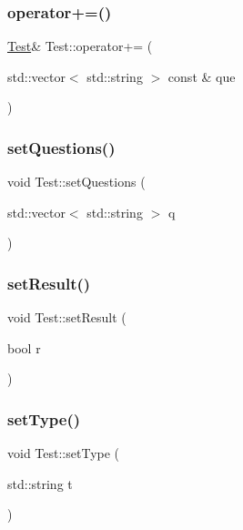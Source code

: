 \subsubsection{\texorpdfstring{operator+=()}{operator+=()}}
{\footnotesize\ttfamily \hyperlink{class_test}{Test}\& Test\+::operator+= (\begin{DoxyParamCaption}\item[{std\+::vector$<$ std\+::string $>$ const \&}]{que }\end{DoxyParamCaption})\hspace{0.3cm}{\ttfamily [inline]}}

\hypertarget{class_test_a114815379828a59a1d3a4ac1750f99bd}{}\label{class_test_a114815379828a59a1d3a4ac1750f99bd} 
\subsubsection{\texorpdfstring{set\+Questions()}{setQuestions()}}
{\footnotesize\ttfamily void Test\+::set\+Questions (\begin{DoxyParamCaption}\item[{std\+::vector$<$ std\+::string $>$}]{q }\end{DoxyParamCaption})\hspace{0.3cm}{\ttfamily [inline]}}

\hypertarget{class_test_ac921aece347e57beb4efd8e10a98a2e2}{}\label{class_test_ac921aece347e57beb4efd8e10a98a2e2} 
\subsubsection{\texorpdfstring{set\+Result()}{setResult()}}
{\footnotesize\ttfamily void Test\+::set\+Result (\begin{DoxyParamCaption}\item[{bool}]{r }\end{DoxyParamCaption})\hspace{0.3cm}{\ttfamily [inline]}}

\hypertarget{class_test_a54f6a794a60c3173b67da6f0f2c13b0a}{}\label{class_test_a54f6a794a60c3173b67da6f0f2c13b0a} 
\subsubsection{\texorpdfstring{set\+Type()}{setType()}}
{\footnotesize\ttfamily void Test\+::set\+Type (\begin{DoxyParamCaption}\item[{std\+::string}]{t }\end{DoxyParamCaption})\hspace{0.3cm}{\ttfamily [inline]}}

